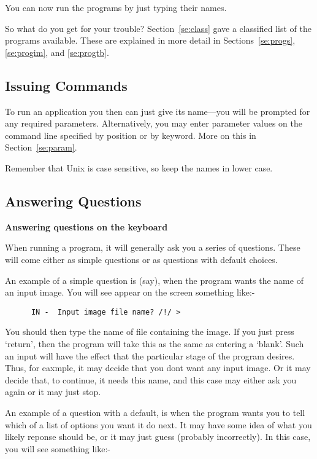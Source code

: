 You can now run the \starman programs by just typing their names.

So what do you get for your trouble?  Section~\ref{se:class} gave a
classified list of the programs available. These are explained in more
detail in Sections~\ref{se:progs}, \ref{se:progim}, and
\ref{se:progtb}.

\subsection{Issuing Commands}

To run an application you then can just give its name---you will be
prompted for any required parameters. Alternatively, you may enter
parameter values on the command line specified by position or by
keyword.  More on this in Section~\ref{se:param}.

Remember that Unix is case sensitive, so keep the names in lower case.

\subsection{Answering Questions}

{\bf \hspace*{2ex} Answering questions on the keyboard}

    When running a program, it will generally ask you a series of
    questions. These will come either as simple questions or as
    questions with default choices.

    An example of a simple question is (say), when the program wants
    the name of an input image. You will see appear on the screen
    something like:-

\begin{verbatim}
      IN -  Input image file name? /!/ > \end{verbatim}

    You should then type the name of file containing the image.  If you
    just press `return', then the program will take this as the same as
    entering a `blank'. Such an input will have the effect that the
    particular stage of the program desires.  Thus, for eaxmple, it may
    decide that you dont want any input image. Or it may decide that,
    to continue, it needs this name, and this case may either ask you
    again or it may just stop.


    An example of a question with a default, is when the program wants
    you to tell which of a list of options you want it do next.  It may
    have some idea of what you likely reponse should be, or it may just
    guess (probably incorrectly). In this case, you will see something
    like:-


